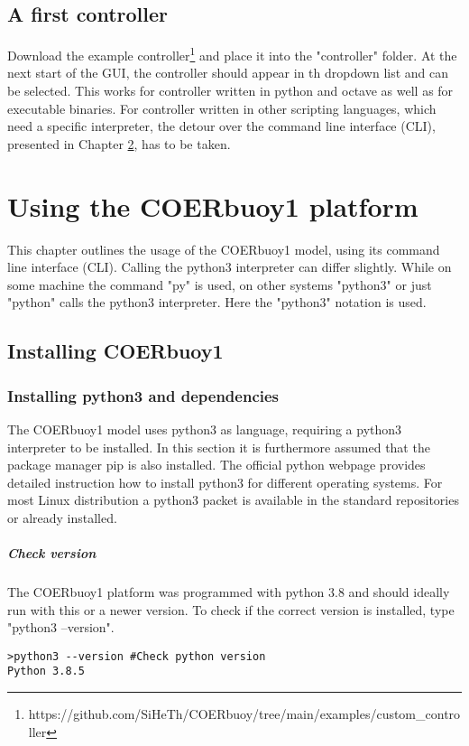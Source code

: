 \documentclass[oneside,10pt,a4paper]{book}
\begin{document}
\section{A first controller}
Download the example controller\footnote{https://github.com/SiHeTh/COERbuoy/tree/main/examples/custom\_controller} and place it into the "controller" folder. At the next start of the GUI, the controller should appear in th dropdown list and can be selected.
This works for controller written in python and octave as well as for executable binaries. For controller written in other scripting languages, which need a specific interpreter, the detour over the command line interface (CLI), presented in Chapter \ref{ch:CLI}, has to be taken.
\chapter{Using the COERbuoy1 platform}\label{ch:CLI}
This chapter outlines the usage of the COERbuoy1 model, using its command line interface (CLI). Calling the python3 interpreter can differ slightly. While on some machine the command "py" is used, on other systems "python3" or just "python" calls the python3 interpreter. Here the "python3" notation is used.
\section{Installing COERbuoy1}
\subsection{Installing python3 and dependencies}
The COERbuoy1 model uses python3 as language, requiring a python3 interpreter to be installed. In this section it is furthermore assumed that the package manager pip is also installed. The official python webpage provides detailed instruction how to install python3 for different operating systems. For most Linux distribution a python3 packet is available in the standard repositories or already installed.
\paragraph{Check version}
The COERbuoy1 platform was programmed with python 3.8 and should ideally run with this or a newer version.
To check if the correct version is installed, type "python3 --version".
\begin{verbatim}
>python3 --version #Check python version
Python 3.8.5
\end{verbatim}
\end{document}
